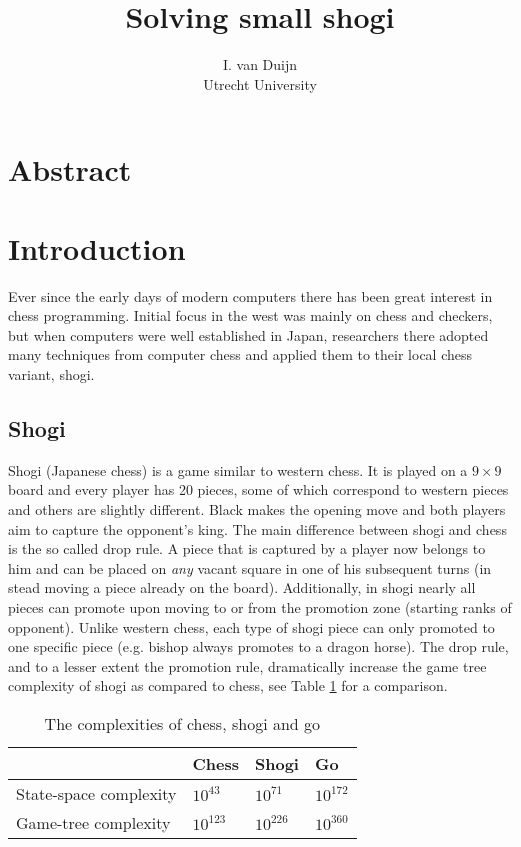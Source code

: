 \documentclass{article}
\title{Solving small shogi}
\author{I. van Duijn \\ Utrecht University}
\begin{document}
\maketitle

\section*{Abstract}

\section{Introduction}
Ever since the early days of modern computers there has been great interest in chess programming. Initial
focus in the west was mainly on chess and checkers, but when computers were well established in Japan, researchers there adopted
many techniques from computer chess and applied them to their local chess variant, shogi.

\subsection{Shogi}
Shogi (Japanese chess) is a game similar to western chess. It is played on a $9 \times 9$ board and every
player has 20 pieces, some of which correspond to western pieces and others are slightly different.
Black makes the opening move and both players aim to capture the opponent's king.
The main difference between shogi and chess is the so called drop rule.
A piece that is captured by a player now belongs to him and can be placed on \textit{any} vacant square in one of his subsequent turns
(in stead moving a piece already on the board).
Additionally, in shogi nearly all pieces can promote upon moving to or from the promotion zone (starting ranks of opponent).
Unlike western chess, each type of shogi piece can only promoted to one specific piece (e.g. bishop always promotes to a dragon horse).
The drop rule, and to a lesser extent the promotion rule, dramatically increase the game tree complexity of shogi as compared to chess, see Table
\ref{table:complex} for a comparison.\\
\begin{table}
\center
\begin{tabular}{l l l l}
 & Chess & Shogi & Go \\ \hline
State-space complexity & $10^{43}$ & $10^{71}$ & $10^{172}$ \\
Game-tree complexity & $10^{123}$ & $10^{226}$ & $10^{360}$ \\ \hline
\end{tabular}
\caption{The complexities of chess, shogi and go}
\label{table:complex}
\end{table}
\end{document}
